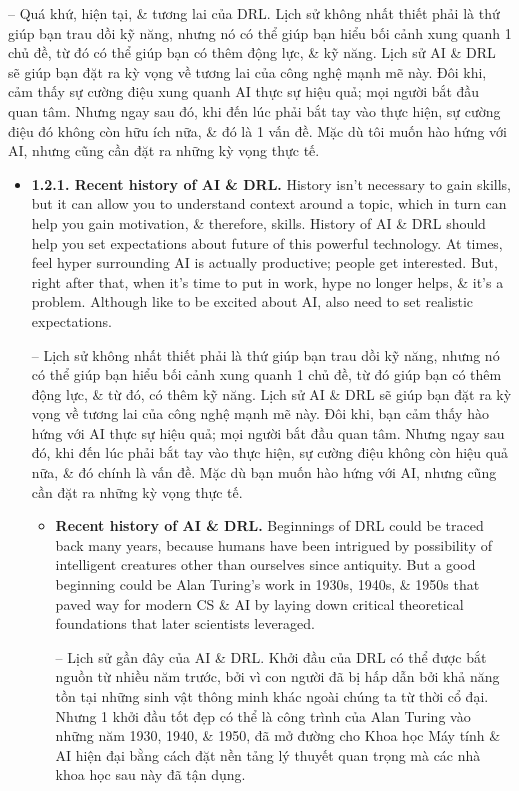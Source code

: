 \documentclass{article}
\begin{document}
\begin{itemize}
\begin{itemize}
        -- {\sf Quá khứ, hiện tại, \& tương lai của DRL.} Lịch sử không nhất thiết phải là thứ giúp bạn trau dồi kỹ năng, nhưng nó có thể giúp bạn hiểu bối cảnh xung quanh 1 chủ đề, từ đó có thể giúp bạn có thêm động lực, \& kỹ năng. Lịch sử AI \& DRL sẽ giúp bạn đặt ra kỳ vọng về tương lai của công nghệ mạnh mẽ này. Đôi khi, cảm thấy sự cường điệu xung quanh AI thực sự hiệu quả; mọi người bắt đầu quan tâm. Nhưng ngay sau đó, khi đến lúc phải bắt tay vào thực hiện, sự cường điệu đó không còn hữu ích nữa, \& đó là 1 vấn đề. Mặc dù tôi muốn hào hứng với AI, nhưng cũng cần đặt ra những kỳ vọng thực tế.
        \begin{itemize}
            \item {\bf1.2.1. Recent history of AI \& DRL.} History isn't necessary to gain skills, but it can allow you to understand context around a topic, which in turn can help you gain motivation, \& therefore, skills. History of AI \& DRL should help you set expectations about future of this powerful technology. At times, feel hyper surrounding AI is actually productive; people get interested. But, right after that, when it's time to put in work, hype no longer helps, \& it's a problem. Although like to be excited about AI, also need to set realistic expectations.

            -- Lịch sử không nhất thiết phải là thứ giúp bạn trau dồi kỹ năng, nhưng nó có thể giúp bạn hiểu bối cảnh xung quanh 1 chủ đề, từ đó giúp bạn có thêm động lực, \& từ đó, có thêm kỹ năng. Lịch sử AI \& DRL sẽ giúp bạn đặt ra kỳ vọng về tương lai của công nghệ mạnh mẽ này. Đôi khi, bạn cảm thấy hào hứng với AI thực sự hiệu quả; mọi người bắt đầu quan tâm. Nhưng ngay sau đó, khi đến lúc phải bắt tay vào thực hiện, sự cường điệu không còn hiệu quả nữa, \& đó chính là vấn đề. Mặc dù bạn muốn hào hứng với AI, nhưng cũng cần đặt ra những kỳ vọng thực tế.
            \begin{itemize}
                \item {\bf Recent history of AI \& DRL.} Beginnings of DRL could be traced back many years, because humans have been intrigued by possibility of intelligent creatures other than ourselves since antiquity. But a good beginning could be Alan Turing's work in 1930s, 1940s, \& 1950s that paved way for modern CS \& AI by laying down critical theoretical foundations that later scientists leveraged.

                -- {\sf Lịch sử gần đây của AI \& DRL.} Khởi đầu của DRL có thể được bắt nguồn từ nhiều năm trước, bởi vì con người đã bị hấp dẫn bởi khả năng tồn tại những sinh vật thông minh khác ngoài chúng ta từ thời cổ đại. Nhưng 1 khởi đầu tốt đẹp có thể là công trình của Alan Turing vào những năm 1930, 1940, \& 1950, đã mở đường cho Khoa học Máy tính \& AI hiện đại bằng cách đặt nền tảng lý thuyết quan trọng mà các nhà khoa học sau này đã tận dụng.


\end{itemize}
\end{itemize}
\end{itemize}
\end{itemize}
\end{document}
